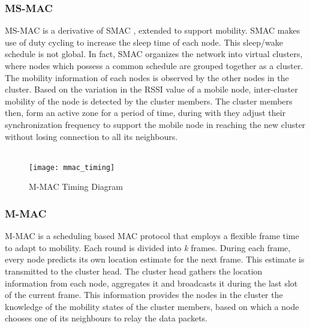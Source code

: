 \subsubsection{MS-MAC}
 MS-MAC \cite{ms-mac} is a derivative of SMAC \cite{smac}, extended to support mobility. SMAC makes use of duty cycling to increase the sleep time of each node. This sleep/wake schedule is not global. In fact, SMAC organizes the network into virtual clusters, where nodes which possess a common schedule are grouped together as a cluster. The mobility information of each nodes is observed by the other nodes in the cluster. Based on the variation in the RSSI value of a mobile node, inter-cluster mobility of the node is detected by the cluster members. The cluster members then, form an active zone for a period of time, during with they adjust their synchronization frequency to support the mobile node in reaching the new cluster without losing connection to all its neighbours. \\\\

\begin{figure}[h]{} 
  \begin{center}
		\texttt{[image: mmac\_timing]}
		\caption{M-MAC Timing Diagram}
	\label{fig:mmac-timing}
  \end{center}
\end{figure}


\subsubsection{M-MAC}
M-MAC \cite{m-mac} is a scheduling based MAC protocol that employs a flexible frame time to adapt to mobility. Each round is divided into \emph{k} frames. During each frame, every node predicts its own location estimate for the next frame. This estimate is transmitted to the cluster head. The cluster head gathers the location information from each node, aggregates it and broadcasts it during the last slot of the current frame. This information provides the nodes in the cluster the knowledge of the mobility states of the cluster members, based on which a node chooses one of its neighbours to relay the data packets.

